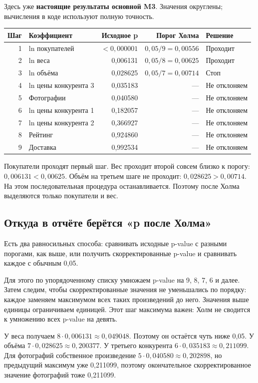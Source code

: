 \documentclass[12pt,a4paper]{article}
\begin{document}
Здесь уже \textbf{настоящие результаты основной M3}. Значения округлены; вычисления в коде используют полную точность.
\begin{center}\small
\begin{tabular}{rlrrl}
\toprule Шаг & Коэффициент & Исходное p & Порог Холма & Решение\\\midrule
1 & ln покупателей & $<0{,}000001$ & $0{,}05/9=0{,}00556$ & Проходит\\
2 & ln веса & 0,006131 & $0{,}05/8=0{,}00625$ & Проходит\\
3 & ln объёма & 0,028625 & $0{,}05/7=0{,}00714$ & Стоп\\
4 & ln цены конкурента 3 & 0,035183 & --- & Не отклоняем\\
5 & Фотографии & 0,040580 & --- & Не отклоняем\\
6 & ln цены конкурента 1 & 0,182057 & --- & Не отклоняем\\
7 & ln цены конкурента 2 & 0,366927 & --- & Не отклоняем\\
8 & Рейтинг & 0,924860 & --- & Не отклоняем\\
9 & Доставка & 0,992534 & --- & Не отклоняем\\
\bottomrule\end{tabular}
\end{center}

Покупатели проходят первый шаг. Вес проходит второй совсем близко к порогу: $0{,}006131<0{,}00625$. Объём на третьем шаге не проходит: $0{,}028625>0{,}00714$. На этом последовательная процедура останавливается. Поэтому после Холма выделяются только покупатели и вес.

\subsection{Откуда в отчёте берётся «p после Холма»}

Есть два равносильных способа: сравнивать исходные p-value с разными порогами, как выше, или получить скорректированные p-value и сравнивать каждое с обычным 0,05.

Для этого по упорядоченному списку умножаем p-value на 9, 8, 7, 6 и далее. Затем следим, чтобы скорректированные значения не уменьшались по порядку: каждое заменяем максимумом всех таких произведений до него. Значения выше единицы ограничиваем единицей. Этот шаг максимума важен: Холм не сводится к умножению всех p-value на девять.

У веса получаем $8\cdot0{,}006131\approx0{,}049048$. Поэтому он остаётся чуть ниже 0,05. У объёма $7\cdot0{,}028625\approx0{,}200377$. У третьего конкурента $6\cdot0{,}035183\approx0{,}211099$. Для фотографий собственное произведение $5\cdot0{,}040580\approx0{,}202898$, но предыдущий максимум уже 0,211099, поэтому окончательное скорректированное значение фотографий тоже 0,211099.
\end{document}
